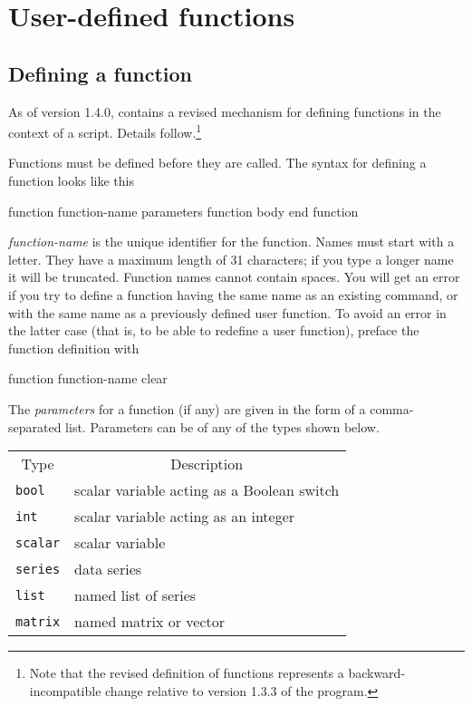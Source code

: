\chapter{User-defined functions}
\label{functions}

\section{Defining a function}
\label{func-define}

As of version 1.4.0,  contains a revised mechanism for
defining functions in the context of a script.  Details
follow.\footnote{Note that the revised definition of functions
  represents a backward-incompatible change relative to version 1.3.3
  of the program.}

Functions must be defined before they are called.  The syntax for
defining a function looks like this
    
\begin{code}
      function function-name parameters
         function body
      end function
\end{code}

\textsl{function-name} is the unique identifier for the function.
Names must start with a letter. They have a maximum length of 31
characters; if you type a longer name it will be truncated.  Function
names cannot contain spaces.  You will get an error if you try to
define a function having the same name as an existing 
command, or with the same name as a previously defined user function.
To avoid an error in the latter case (that is, to be able to redefine
a user function), preface the function definition with
    
\begin{code}
      function function-name clear
\end{code}

The \textsl{parameters} for a function (if any) are given in the form
of a comma-separated list.  Parameters can be of any of the types
shown below.

\begin{center}
\begin{tabular}{ll}
\multicolumn{1}{c}{Type} & 
\multicolumn{1}{c}{Description} \\ [4pt]
\texttt{bool} & scalar variable acting as a Boolean switch \\
\texttt{int}  & scalar variable acting as an integer  \\
\texttt{scalar} & scalar variable \\
\texttt{series} & data series \\
\texttt{list}   & named list of series \\
\texttt{matrix} & named matrix or vector 
\end{tabular}
\end{center}

